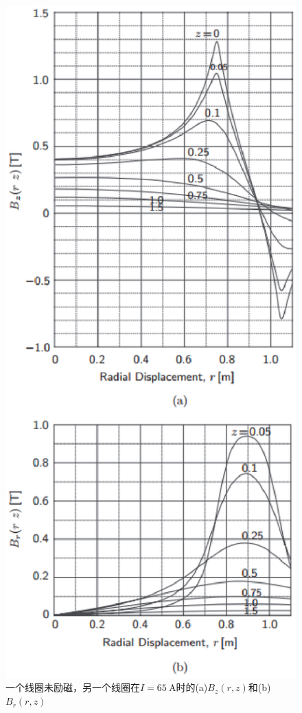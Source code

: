 \begin{figure}[htbp]
	\centering
	\includegraphics[scale=0.9]{chpt3/figs/fig3.42.eps}
	\caption{一个线圈未励磁，另一个线圈在$I =65\ \mathrm{A}$时的(a)$B_z(r, z)$和(b) $B_r(r, z)$}
\end{figure}

